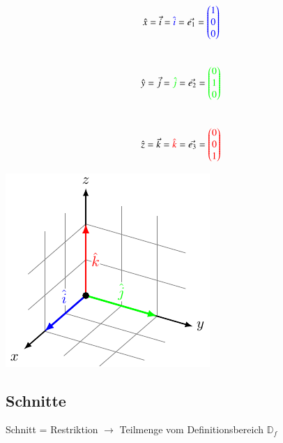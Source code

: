 \begin{minipage}[c]{0.48\columnwidth}
    $$\hat{x}=\vec{i}={\color{blue}\hat{i}}=\vec{{e}_1}=
{\color{blue}\begin{pmatrix}
    1 \\
    0 \\
    0
\end{pmatrix}}$$\\
$$\hat{y}=\vec{j}={\color{green}\hat{j}}=\vec{{e}_2}=
{\color{green}\begin{pmatrix}
    0 \\
    1 \\
    0
\end{pmatrix}}$$\\
$$\hat{z}=\vec{k}={\color{red}\hat{k}}=\vec{{e}_3}=
{\color{red}\begin{pmatrix}
    0 \\
    0 \\
    1
\end{pmatrix}}$$
\end{minipage}
\hfill
\begin{minipage}[c]{0.48\columnwidth}
    \includegraphics[width=\columnwidth]{images/einheitsvektoren.pdf}
\end{minipage}




\subsection{Schnitte}
Schnitt = Restriktion $\rightarrow$ Teilmenge vom Definitionsbereich ${\mathbb{D}_f}$



